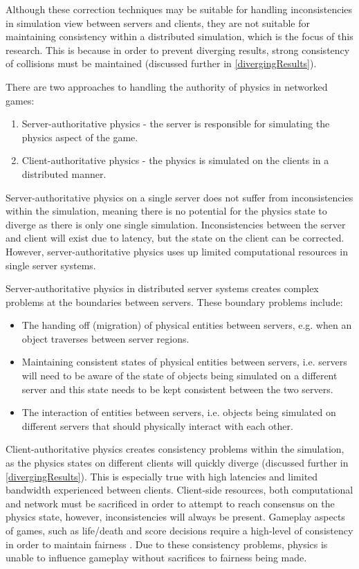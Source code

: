 Although these correction techniques may be suitable for handling inconsistencies in simulation view between servers and clients, they are not suitable for maintaining consistency within a distributed simulation, which is the focus of this research. This is because in order to prevent diverging results, strong consistency of collisions must be maintained (discussed further in \ref{divergingResults}). 

There are two approaches to handling the authority of physics in networked games:

\begin{enumerate}
	\item Server-authoritative physics - the server is responsible for simulating the physics aspect of the game.
	\item Client-authoritative physics - the physics is simulated on the clients in a distributed manner.
\end{enumerate}

Server-authoritative physics on a single server does not suffer from inconsistencies within the simulation, meaning there is no potential for the physics state to diverge as there is only one single simulation. Inconsistencies between the server and client will exist due to latency, but the state on the client can be corrected. However, server-authoritative physics uses up limited computational resources in single server systems.

Server-authoritative physics in distributed server systems creates complex problems at the boundaries between servers. These boundary problems include:
\begin{itemize}
\item The handing off (migration) of physical entities between servers, e.g. when an object traverses between server regions.
\item Maintaining consistent states of physical entities between servers, i.e. servers will need to be aware of the state of objects being simulated on a different server and this state needs to be kept consistent between the two servers. 
\item The interaction of entities between servers, i.e. objects being simulated on different servers that should physically interact with each other.
\end{itemize}

Client-authoritative physics creates consistency problems within the simulation, as the physics states on different clients will quickly diverge (discussed further in \ref{divergingResults}). This is especially true with high latencies and limited bandwidth experienced between clients. Client-side resources, both computational and network must be sacrificed in order to attempt to reach consensus on the physics state, however, inconsistencies will always be present. Gameplay aspects of games, such as life/death and score decisions require a high-level of consistency in order to maintain fairness \cite{savery2014consistency}. Due to these consistency problems, physics is unable to influence gameplay without sacrifices to fairness being made.

